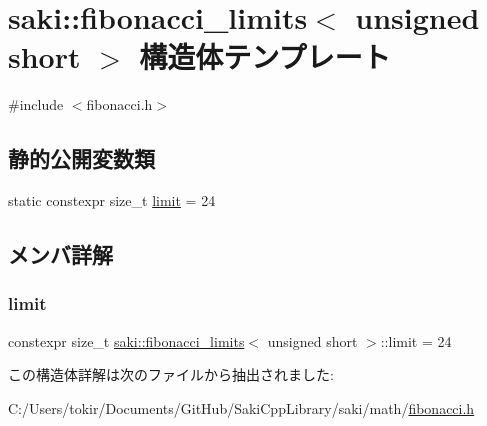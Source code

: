 \hypertarget{structsaki_1_1fibonacci__limits_3_01unsigned_01short_01_4}{}\section{saki\+:\+:fibonacci\+\_\+limits$<$ unsigned short $>$ 構造体テンプレート}
\label{structsaki_1_1fibonacci__limits_3_01unsigned_01short_01_4}


{\ttfamily \#include $<$fibonacci.\+h$>$}

\subsection*{静的公開変数類}
\begin{DoxyCompactItemize}
\item 
static constexpr size\+\_\+t \mbox{\hyperlink{structsaki_1_1fibonacci__limits_3_01unsigned_01short_01_4_af057ada046d709babcbf257fe1b6b954}{limit}} = 24
\end{DoxyCompactItemize}


\subsection{メンバ詳解}
\mbox{\label{structsaki_1_1fibonacci__limits_3_01unsigned_01short_01_4_af057ada046d709babcbf257fe1b6b954}} 
\subsubsection{\texorpdfstring{limit}{limit}}
{\footnotesize\ttfamily constexpr size\+\_\+t \mbox{\hyperlink{structsaki_1_1fibonacci__limits}{saki\+::fibonacci\+\_\+limits}}$<$ unsigned short $>$\+::limit = 24\hspace{0.3cm}{\ttfamily [static]}}



この構造体詳解は次のファイルから抽出されました\+:\begin{DoxyCompactItemize}
\item 
C\+:/\+Users/tokir/\+Documents/\+Git\+Hub/\+Saki\+Cpp\+Library/saki/math/\mbox{\hyperlink{fibonacci_8h}{fibonacci.\+h}}\end{DoxyCompactItemize}
